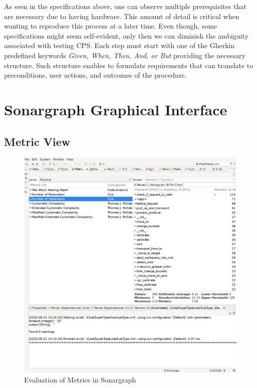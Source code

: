 As seen in the specifications above, one can observe multiple prerequisites that are necessary due to having hardware. This amount of detail is critical when wanting to reproduce this process at a later time. Even though, some specifications might seem self-evident, only then we can diminish the ambiguity associated with testing CPS. Each step must start with one of the Gherkin predefined keywords \emph{Given, When, Then, And, or But} providing the necessary structure. Such structure enables to formulate requirements that can translate to preconditions, user actions, and outcomes of the procedure.

\chapter{Sonargraph Graphical Interface}
\newpage

\section{Metric View}
\begin{figure}[htp]
    \centering
    \includegraphics[width=\textwidth, frame]{./latex/appendix/sonar-metrics}
    \caption{Evaluation of Metrics in Sonargraph}
    \label{appendix:metrics}
\end{figure}

